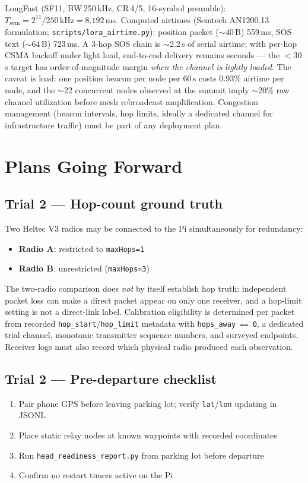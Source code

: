 \documentclass[11pt,letterpaper]{article}
\begin{document}
LongFast (SF11, BW\,250\,kHz, CR\,4/5, 16-symbol preamble): $T_{\mathrm{sym}} =
2^{11}/250\,\mathrm{kHz} = 8.192$\,ms. Computed airtimes (Semtech AN1200.13
formulation; \texttt{scripts/lora\_airtime.py}): position packet ($\sim$40\,B)
559\,ms, SOS text ($\sim$64\,B) 723\,ms. A 3-hop SOS chain is $\sim$2.2\,s of serial
airtime; with per-hop CSMA backoff under light load, end-to-end delivery remains
seconds --- the $<$30\,s target has order-of-magnitude margin \emph{when the channel
is lightly loaded}. The caveat is load: one position beacon per node per 60\,s costs
0.93\% airtime per node, and the $\sim$22 concurrent nodes observed at the summit
imply $\sim$20\% raw channel utilization before mesh rebroadcast amplification.
Congestion management (beacon intervals, hop limits, ideally a dedicated channel for
infrastructure traffic) must be part of any deployment plan.

\section{Plans Going Forward}
\label{sec:forward}

\subsection*{Trial 2 --- Hop-count ground truth}
Two Heltec V3 radios may be connected to the Pi simultaneously for redundancy:
\begin{itemize}[noitemsep]
  \item \textbf{Radio A}: restricted to \texttt{maxHops=1}
  \item \textbf{Radio B}: unrestricted (\texttt{maxHops=3})
\end{itemize}
The two-radio comparison does \emph{not} by itself establish hop truth: independent
packet loss can make a direct packet appear on only one receiver, and a hop-limit
setting is not a direct-link label. Calibration eligibility is determined per packet
from recorded \texttt{hop\_start}/\texttt{hop\_limit} metadata with
\texttt{hops\_away == 0}, a dedicated trial channel, monotonic transmitter sequence
numbers, and surveyed endpoints. Receiver logs must also record which physical radio
produced each observation.

\subsection*{Trial 2 --- Pre-departure checklist}
\begin{enumerate}[noitemsep]
  \item Pair phone GPS before leaving parking lot; verify \texttt{lat}/\texttt{lon} updating in JSONL
  \item Place static relay nodes at known waypoints with recorded coordinates
  \item Run \texttt{head\_readiness\_report.py} from parking lot before departure
  \item Confirm no restart timers active on the Pi
\end{enumerate}
\end{document}
